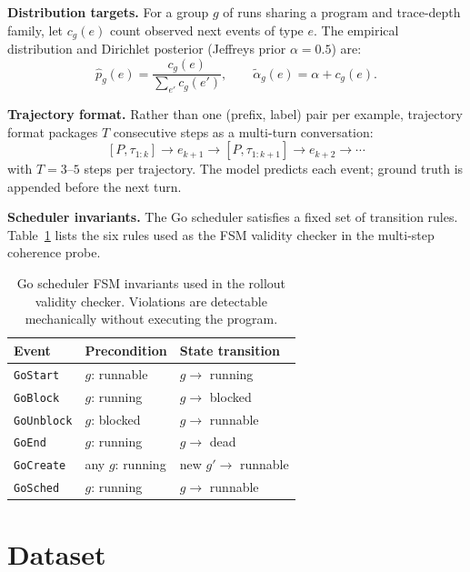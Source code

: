\documentclass[10pt,conference]{IEEEtran}
\newcommand{\eblock}{\texttt{GoBlock}}
\newcommand{\eunblock}{\texttt{GoUnblock}}
\newcommand{\estart}{\texttt{GoStart}}
\newcommand{\ecreate}{\texttt{GoCreate}}
\newcommand{\eend}{\texttt{GoEnd}}
\newcommand{\esched}{\texttt{GoSched}}
\begin{document}
\textbf{Distribution targets.}
For a group $g$ of runs sharing a program and trace-depth family, let
$c_g(e)$ count observed next events of type $e$.
The empirical distribution and Dirichlet posterior (Jeffreys prior
$\alpha{=}0.5$) are:
\begin{equation}\label{eq:dist}
\hat{p}_g(e)=\frac{c_g(e)}{\sum_{e'}c_g(e')},\qquad
\tilde{\alpha}_g(e)=\alpha+c_g(e).
\end{equation}

\textbf{Trajectory format.}
Rather than one (prefix, label) pair per example, trajectory format
packages $T$ consecutive steps as a multi-turn conversation:
\begin{equation}\label{eq:traj}
[P,\tau_{1:k}]\!\to\!e_{k+1}\!\to\![P,\tau_{1:k+1}]\!\to\!e_{k+2}\!\to\!\cdots
\end{equation}
with $T{=}3\text{--}5$ steps per trajectory.
The model predicts each event; ground truth is appended before the
next turn.

\textbf{Scheduler invariants.}
The Go scheduler satisfies a fixed set of transition rules.
Table~\ref{tab:fsm} lists the six rules used as the FSM validity
checker in the multi-step coherence probe.

\begin{table}[t]
\centering
\caption{Go scheduler FSM invariants used in the rollout validity
checker. Violations are detectable mechanically without executing the
program.}
\label{tab:fsm}
\vspace*{8pt}
\small
\begin{tabular}{@{}p{1.5cm}p{2.1cm}p{3.1cm}@{}}
\toprule
\textbf{Event} & \textbf{Precondition} & \textbf{State transition}\\
\midrule
\estart   & $g$: runnable & $g \to$ running\\
\eblock   & $g$: running  & $g \to$ blocked\\
\eunblock & $g$: blocked  & $g \to$ runnable\\
\eend     & $g$: running  & $g \to$ dead\\
\ecreate  & any $g$: running & new $g' \to$ runnable\\
\esched   & $g$: running  & $g \to$ runnable\\
\bottomrule
\end{tabular}
\end{table}

\section{Dataset}\label{sec:data}
\end{document}
